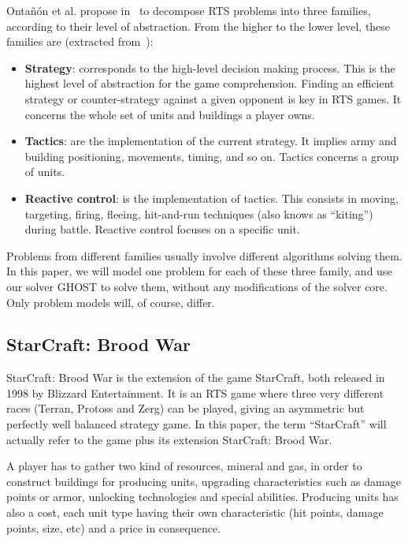 \documentclass[journal]{IEEEtran}
\newcommand{\ghost}{\textsc{GHOST}\xspace}
\begin{document}
Onta{\~n}{\'o}n et  al. propose in~\cite{OntanonSURCM13}  to decompose
RTS  problems  into  three  families,  according  to  their  level  of
abstraction. From  the higher to  the lower level, these  families are
(extracted from~\cite{OntanonSURCM13}):
\begin{itemize}
\item {\bf  Strategy}: corresponds  to the high-level  decision making
  process.  This is  the highest  level  of abstraction  for the  game
  comprehension.  Finding an  efficient  strategy or  counter-strategy
  against a given opponent is key  in RTS games. It concerns the whole
  set of units and buildings a player owns.
\item {\bf Tactics}:  are the implementation of  the current strategy.
  It implies army and building  positioning, movements, timing, and so
  on. Tactics concerns a group of units.
\item {\bf Reactive  control}: is the implementation  of tactics. This
  consists   in  moving,   targeting,  firing,   fleeing,  hit-and-run
  techniques  (also  knows  as ``kiting'')  during  battle.   Reactive
  control focuses on a specific unit.
\end{itemize}
Problems from different families  usually involve different algorithms
solving them.  In this paper,  we will model  one problem for  each of
these three family,  and use our solver \ghost to  solve them, without
any modifications  of the  solver core. Only  problem models  will, of
course, differ.

\subsection{StarCraft: Brood War}

StarCraft:  Brood War  is the  extension of  the game  StarCraft, both
released in 1998  by Blizzard Entertainment.  It is an  RTS game where
three very different  races (Terran, Protoss and Zerg)  can be played,
giving an  asymmetric but perfectly  well balanced strategy  game.  In
this paper,  the term  ``StarCraft'' will actually  refer to  the game
plus its extension StarCraft: Brood War.

A player  has to  gather two  kind of resources,  mineral and  gas, in
order   to  construct   buildings  for   producing  units,   upgrading
characteristics such as damage points or armor, unlocking technologies
and special abilities. Producing units has also a cost, each unit type
having their own characteristic (hit points, damage points, size, etc)
and a price in consequence.
\end{document}
